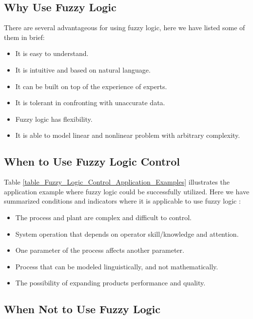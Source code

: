 \documentclass{article}
\begin{document}
\subsection{Why Use Fuzzy Logic}\label{Why_Use_Fuzzy_Logic}


There are several advantageous for using fuzzy logic, here we have listed some of them in brief: 
\citep{Fuzzy_Logic_Toolbox_For_Use_with_MATLAB}
\begin{itemize}
\item It is easy to understand.
\item It is intuitive and based on natural language. 
\item It can be built on top of the experience of experts.
\item It is tolerant in confronting with unaccurate data.
\item Fuzzy logic has flexibility.
\item It is able to model linear and nonlinear problem with arbitrary complexity.

\end{itemize}
\subsection{When to Use Fuzzy Logic Control}\label{When_to_Use_Fuzzy_Logic_Control}
Table \ref{table_Fuzzy_Logic_Control_Application_Examples} illustrates the application example where 
fuzzy logic could be successfully utilized. Here we have summarized conditions and indicators 
where it is applicable to use fuzzy logic\citep{299142} :

\begin{itemize}
\item The process and plant are complex and difficult to control.
\item System operation that depends on operator skill/knowledge and attention.
\item One parameter of the process affects another parameter. 
\item Process that can be modeled linguistically, and not mathematically. 
\item The possibility of expanding products performance and quality.

\end{itemize}
\subsection{When Not to Use Fuzzy Logic}\label{When_Not_to_Use_Fuzzy_Logic}
\end{document}
